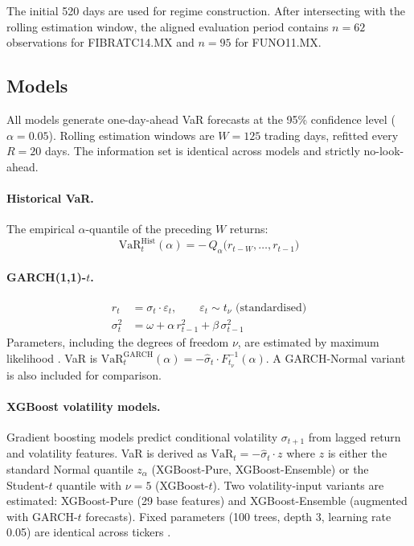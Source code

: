 \documentclass[12pt,a4paper]{article}
\begin{document}
The initial 520 days are used for regime construction. After intersecting with the rolling estimation window, the aligned evaluation period contains $n = 62$ observations for FIBRATC14.MX and $n = 95$ for FUNO11.MX.

\subsection{Models}

All models generate one-day-ahead VaR forecasts at the 95\% confidence level ($\alpha = 0.05$). Rolling estimation windows are $W = 125$ trading days, refitted every $R = 20$ days. The information set is identical across models and strictly no-look-ahead.

\paragraph{Historical VaR.}
The empirical $\alpha$-quantile of the preceding $W$ returns:
\begin{equation}
\mathrm{VaR}_t^{\mathrm{Hist}}(\alpha) = -\,Q_{\alpha}\bigl(r_{t-W}, \dots, r_{t-1}\bigr) \label{eq:hist}
\end{equation}

\paragraph{GARCH(1,1)-$t$.}
\begin{align}
r_t &= \sigma_t \cdot \varepsilon_t, \qquad \varepsilon_t \sim t_{\nu} \text{ (standardised)} \nonumber\\
\sigma_t^{2} &= \omega + \alpha\, r_{t-1}^{2} + \beta\, \sigma_{t-1}^{2} \label{eq:garch}
\end{align}
Parameters, including the degrees of freedom $\nu$, are estimated by maximum likelihood \cite{bollerslev1986generalized,bollerslev1987conditionally}. VaR is $\mathrm{VaR}_t^{\mathrm{GARCH}}(\alpha) = -\hat{\sigma}_t \cdot F_{t_{\nu}}^{-1}(\alpha)$. A GARCH-Normal variant is also included for comparison.

\paragraph{XGBoost volatility models.}
Gradient boosting models predict conditional volatility $\sigma_{t+1}$ from lagged return and volatility features. VaR is derived as $\mathrm{VaR}_t = -\hat{\sigma}_{t} \cdot z$ where $z$ is either the standard Normal quantile $z_{\alpha}$ (XGBoost-Pure, XGBoost-Ensemble) or the Student-$t$ quantile with $\nu = 5$ (XGBoost-$t$). Two volatility-input variants are estimated: XGBoost-Pure (29 base features) and XGBoost-Ensemble (augmented with GARCH-$t$ forecasts). Fixed parameters (100 trees, depth 3, learning rate 0.05) are identical across tickers \cite{chen2016xgboost}.
\end{document}
